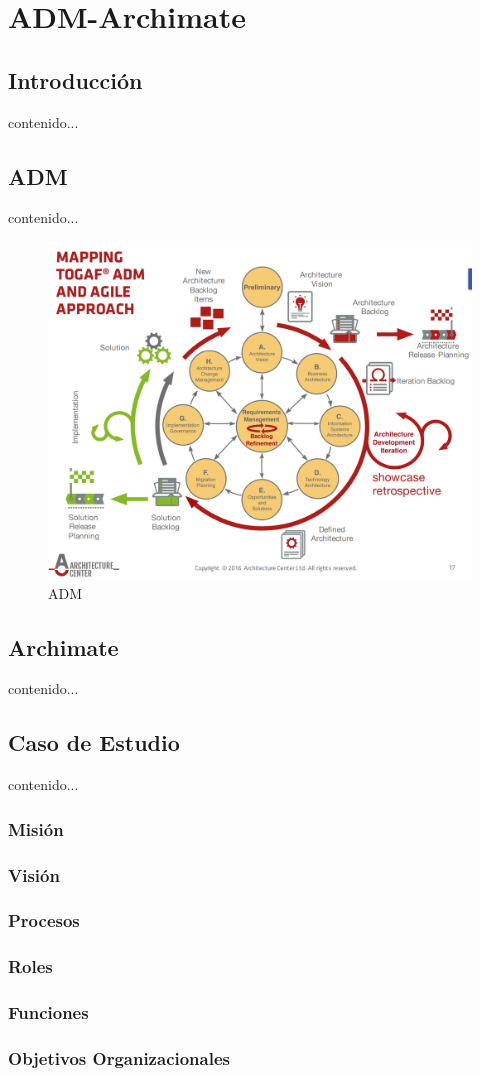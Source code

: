 \chapter{ADM-Archimate}
\section{Introducción}
contenido...
\newpage

\section{ADM}
contenido...

\begin{figure}[h!]
	\centering
	\includegraphics[width=0.7\linewidth]{ARQUITECTURA/imgs/adm}
	\caption{ADM \cite{SB,1579133,6337726,6337730,6827125}}
\end{figure}


\newpage

\section{Archimate}
contenido...

\newpage

\section{Caso de Estudio}
contenido...

\subsection{Misión}

\subsection{Visión}

\subsection{Procesos}

\subsection{Roles}

\subsection{Funciones}

\subsection{Objetivos Organizacionales}

\newpage
